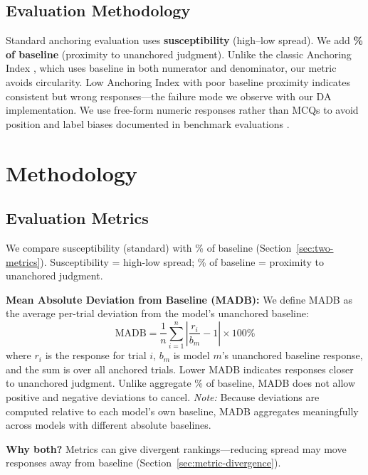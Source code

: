 \documentclass[11pt]{article}
\begin{document}
\subsection{Evaluation Methodology}

Standard anchoring evaluation uses \textbf{susceptibility} (high--low spread). We add \textbf{\% of baseline} (proximity to unanchored judgment). Unlike the classic Anchoring Index \citep{jacowitz1995}, which uses baseline in both numerator and denominator, our metric avoids circularity. Low Anchoring Index with poor baseline proximity indicates consistent but wrong responses---the failure mode we observe with our DA implementation. We use free-form numeric responses rather than MCQs to avoid position and label biases documented in benchmark evaluations \citep{nowak2026abcd}.

\section{Methodology}

\subsection{Evaluation Metrics}
\label{sec:methodology-metrics}

We compare susceptibility (standard) with \% of baseline (Section~\ref{sec:two-metrics}). Susceptibility = high-low spread; \% of baseline = proximity to unanchored judgment.

\textbf{Mean Absolute Deviation from Baseline (MADB):} We define MADB as the average per-trial deviation from the model's unanchored baseline:
\begin{equation}
\text{MADB} = \frac{1}{n} \sum_{i=1}^{n} \left| \frac{r_i}{b_m} - 1 \right| \times 100\%
\end{equation}
where $r_i$ is the response for trial $i$, $b_m$ is model $m$'s unanchored baseline response, and the sum is over all anchored trials. Lower MADB indicates responses closer to unanchored judgment. Unlike aggregate \% of baseline, MADB does not allow positive and negative deviations to cancel. \textit{Note:} Because deviations are computed relative to each model's own baseline, MADB aggregates meaningfully across models with different absolute baselines.

\textbf{Why both?} Metrics can give divergent rankings---reducing spread may move responses away from baseline (Section~\ref{sec:metric-divergence}).
\end{document}
